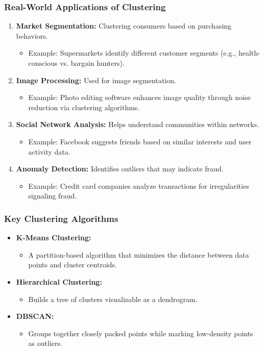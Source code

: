 \documentclass[aspectratio=169]{beamer}
\begin{document}
\begin{frame}[fragile]
    \frametitle{Real-World Applications of Clustering}
    \begin{enumerate}
        \item \textbf{Market Segmentation:} Clustering consumers based on purchasing behaviors.
            \begin{itemize}
                \item Example: Supermarkets identify different customer segments (e.g., health-conscious vs. bargain hunters).
            \end{itemize}
        \item \textbf{Image Processing:} Used for image segmentation.
            \begin{itemize}
                \item Example: Photo editing software enhances image quality through noise reduction via clustering algorithms.
            \end{itemize}
        \item \textbf{Social Network Analysis:} Helps understand communities within networks.
            \begin{itemize}
                \item Example: Facebook suggests friends based on similar interests and user activity data.
            \end{itemize}
        \item \textbf{Anomaly Detection:} Identifies outliers that may indicate fraud.
            \begin{itemize}
                \item Example: Credit card companies analyze transactions for irregularities signaling fraud.
            \end{itemize}
    \end{enumerate}
\end{frame}

\begin{frame}[fragile]
    \frametitle{Key Clustering Algorithms}
    \begin{itemize}
        \item \textbf{K-Means Clustering:} 
            \begin{itemize}
                \item A partition-based algorithm that minimizes the distance between data points and cluster centroids.
            \end{itemize}
        \item \textbf{Hierarchical Clustering:} 
            \begin{itemize}
                \item Builds a tree of clusters visualizable as a dendrogram.
            \end{itemize}
        \item \textbf{DBSCAN:} 
            \begin{itemize}
                \item Groups together closely packed points while marking low-density points as outliers.
            \end{itemize}
    \end{itemize}
\end{frame}
\end{document}

